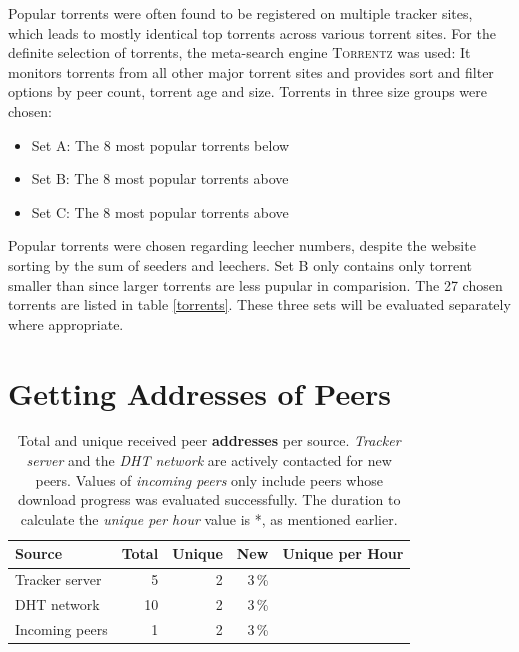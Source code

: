 \documentclass[10pt, a4paper, twoside, headsepline]{scrbook}
\renewcommand{\_}{\origunderscore\allowbreak}
\begin{document}
Popular torrents were often found to be registered on multiple tracker sites, which leads to mostly identical top torrents across various torrent sites. For the definite selection of torrents, the meta-search engine \textsc{Torrentz} \cite{torrentz} was used: It monitors torrents from all other major torrent sites and provides sort and filter options by peer count, torrent age and size. Torrents in three size groups were chosen:

\begin{itemize}
  \item Set A: The 8 most popular torrents below  %
  \item Set B: The 8 most popular torrents above  %
  \item Set C: The 8 most popular torrents above  %
\end{itemize}

Popular torrents were chosen regarding leecher numbers, despite the website sorting by the sum of seeders and leechers. Set B only contains only torrent smaller than  since larger torrents are less pupular in comparision. The 27 chosen torrents are listed in table \ref{torrents}. These three sets will be evaluated separately where appropriate.

\section{Getting Addresses of Peers}
\begin{table}
\centering
\begin{tabular}{lrrrr}
\toprule
Source & Total & Unique & New & Unique per Hour \\
\midrule
Tracker server & 5 & 2 & 3\,\% \\
DHT network & 10 & 2 & 3\,\% \\
Incoming peers & 1 & 2 & 3\,\% \\
\bottomrule
\end{tabular}
\caption[Received peer addresses per source]{Total and unique received peer \textbf{addresses} per source. \emph{Tracker server} and the \emph{DHT network} are actively contacted for new peers. Values of \emph{incoming peers} only include peers whose download progress was evaluated successfully. The duration to calculate the \emph{unique per hour} value is *, as mentioned earlier.}
\label{unique-peers}
\end{table}
\end{document}
